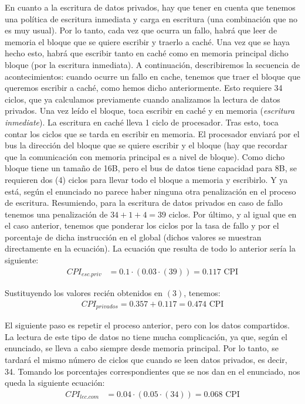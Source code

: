 \documentclass[12pt,a4paper]{article}
\begin{document}
En cuanto a la escritura de datos privados, hay que tener en cuenta que tenemos una política de escritura inmediata y carga en escritura (una combinación que no es muy usual). Por lo tanto, cada vez que ocurra un fallo, habrá que leer de memoria el bloque que se quiere escribir y traerlo a caché. Una vez que se haya hecho esto, habrá que escribir tanto en caché como en memoria principal dicho bloque (por la escritura inmediata). A continuación, describiremos la secuencia de acontecimientos: cuando ocurre un fallo en cache, tenemos que traer el bloque que queremos escribir a caché, como hemos dicho anteriormente. Esto requiere 34 ciclos, que ya calculamos previamente cuando analizamos la lectura de datos privados. Una vez leído el bloque, toca escribir en caché y en memoria (\textit{escritura inmediate}). La escritura en caché lleva 1 ciclo de procesador. Tras esto, toca contar los ciclos que se tarda en escribir en memoria. El procesador enviará por el bus la dirección del bloque que se quiere escribir y el bloque (hay que recordar que la comunicación con memoria principal es a nivel de bloque). Como dicho bloque tiene un tamaño de 16B, pero el bus de datos tiene capacidad para 8B, se requieren dos (4) ciclos para llevar todo el bloque a memoria y escribirlo. Y ya está, según el enunciado no parece haber ninguna otra penalización en el proceso de escritura. Resumiendo, para la escritura de datos privados en caso de fallo tenemos una penalización de $34+1+4=39$ ciclos. Por último, y al igual que en el caso anterior, tenemos que ponderar los ciclos por la tasa de fallo y por el porcentaje de dicha instrucción en el global (dichos valores se muestran directamente en la ecuación). La ecuación que resulta de todo lo anterior sería la siguiente:
\begin{align*}
CPI_{esc.priv}&=0.1\cdot (0.03\cdot (39))=0.117\text{ CPI}
\end{align*}

Sustituyendo los valores recién obtenidos en $(3)$, tenemos:
\begin{align*}
CPI_{privados}=0.357+0.117=0.474 \text{ CPI}
\end{align*}

El siguiente paso es repetir el proceso anterior, pero con los datos compartidos. La lectura de este tipo de datos no tiene mucha complicación, ya que, según el enunciado, se lleva a cabo siempre desde memoria principal. Por lo tanto, se tardará el mismo número de ciclos que cuando se leen datos privados, es decir, 34. Tomando los porcentajes correspondientes que se nos dan en el enunciado, nos queda la siguiente ecuación:
\begin{align*}
CPI_{lec.com}&=0.04\cdot (0.05\cdot (34))=0.068\text{ CPI}
\end{align*}
\end{document}
